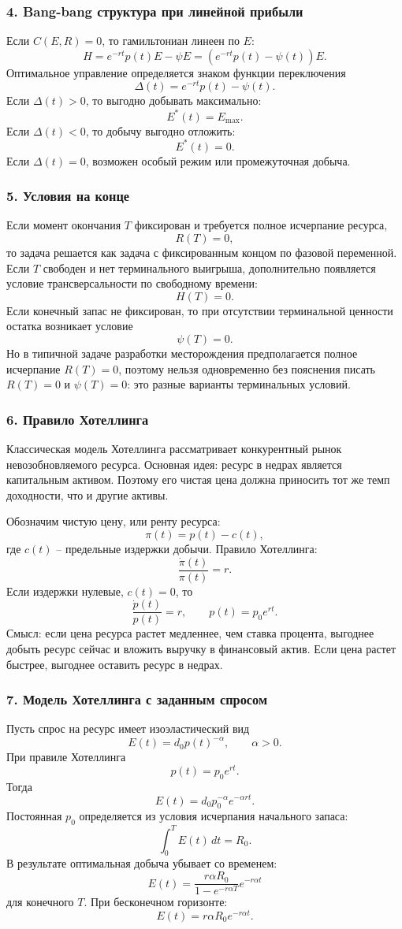\documentclass[12pt,a4paper]{article}
\begin{document}
\subsubsection*{4. Bang-bang структура при линейной прибыли}
Если $C(E,R)=0$, то гамильтониан линеен по $E$:
\[
H=e^{-rt}p(t)E-\psi E=(e^{-rt}p(t)-\psi(t))E.
\]
Оптимальное управление определяется знаком функции переключения
\[
\Delta(t)=e^{-rt}p(t)-\psi(t).
\]
Если $\Delta(t)>0$, то выгодно добывать максимально:
\[
E^*(t)=E_{\max}.
\]
Если $\Delta(t)<0$, то добычу выгодно отложить:
\[
E^*(t)=0.
\]
Если $\Delta(t)=0$, возможен особый режим или промежуточная добыча.

\subsubsection*{5. Условия на конце}
Если момент окончания $T$ фиксирован и требуется полное исчерпание ресурса,
\[
R(T)=0,
\]
то задача решается как задача с фиксированным концом по фазовой переменной. Если $T$ свободен и нет терминального выигрыша, дополнительно появляется условие трансверсальности по свободному времени:
\[
H(T)=0.
\]
Если конечный запас не фиксирован, то при отсутствии терминальной ценности остатка возникает условие
\[
\psi(T)=0.
\]
Но в типичной задаче разработки месторождения предполагается полное исчерпание $R(T)=0$, поэтому нельзя одновременно без пояснения писать $R(T)=0$ и $\psi(T)=0$: это разные варианты терминальных условий.

\subsubsection*{6. Правило Хотеллинга}
Классическая модель Хотеллинга рассматривает конкурентный рынок невозобновляемого ресурса. Основная идея: ресурс в недрах является капитальным активом. Поэтому его чистая цена должна приносить тот же темп доходности, что и другие активы.

Обозначим чистую цену, или ренту ресурса:
\[
\pi(t)=p(t)-c(t),
\]
где $c(t)$ -- предельные издержки добычи. Правило Хотеллинга:
\[
\frac{\dot\pi(t)}{\pi(t)}=r.
\]
Если издержки нулевые, $c(t)=0$, то
\[
\frac{\dot p(t)}{p(t)}=r,
\qquad
p(t)=p_0e^{rt}.
\]
Смысл: если цена ресурса растет медленнее, чем ставка процента, выгоднее добыть ресурс сейчас и вложить выручку в финансовый актив. Если цена растет быстрее, выгоднее оставить ресурс в недрах.

\subsubsection*{7. Модель Хотеллинга с заданным спросом}
Пусть спрос на ресурс имеет изоэластический вид
\[
E(t)=d_0p(t)^{-\alpha},\qquad \alpha>0.
\]
При правиле Хотеллинга
\[
p(t)=p_0e^{rt}.
\]
Тогда
\[
E(t)=d_0p_0^{-\alpha}e^{-\alpha rt}.
\]
Постоянная $p_0$ определяется из условия исчерпания начального запаса:
\[
\int_0^T E(t)\,dt=R_0.
\]
В результате оптимальная добыча убывает со временем:
\[
E(t)=\frac{r\alpha R_0}{1-e^{-r\alpha T}}e^{-r\alpha t}
\]
для конечного $T$. При бесконечном горизонте:
\[
E(t)=r\alpha R_0e^{-r\alpha t}.
\]
\end{document}

